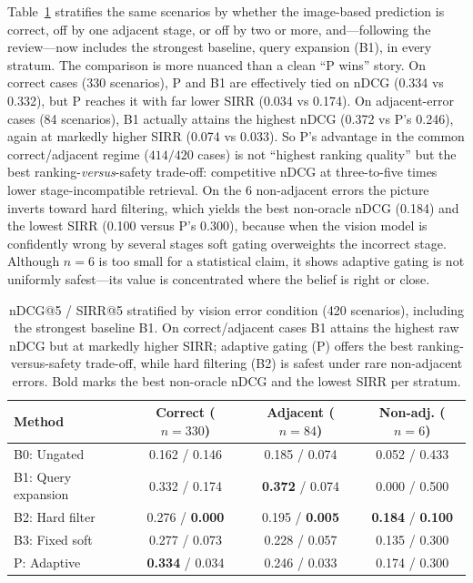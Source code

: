 \documentclass{llncs}
\begin{document}
Table~\ref{tab:strat} stratifies the same scenarios by whether the image-based prediction is correct, off by one adjacent stage, or off by two or more, and---following the review---now includes the strongest baseline, query expansion (B1), in every stratum. The comparison is more nuanced than a clean ``P wins'' story. On correct cases (330 scenarios), P and B1 are effectively tied on nDCG (0.334 vs 0.332), but P reaches it with far lower SIRR (0.034 vs 0.174). On adjacent-error cases (84 scenarios), B1 actually attains the highest nDCG (0.372 vs P's 0.246), again at markedly higher SIRR (0.074 vs 0.033). So P's advantage in the common correct/adjacent regime ($414/420$ cases) is not ``highest ranking quality'' but the best ranking-\emph{versus}-safety trade-off: competitive nDCG at three-to-five times lower stage-incompatible retrieval. On the 6 non-adjacent errors the picture inverts toward hard filtering, which yields the best non-oracle nDCG (0.184) and the lowest SIRR (0.100 versus P's 0.300), because when the vision model is confidently wrong by several stages soft gating overweights the incorrect stage. Although $n=6$ is too small for a statistical claim, it shows adaptive gating is not uniformly safest---its value is concentrated where the belief is right or close.

\begin{table}[t]
\centering
\caption{nDCG@5 / SIRR@5 stratified by vision error condition (420 scenarios), including the strongest baseline B1. On correct/adjacent cases B1 attains the highest raw nDCG but at markedly higher SIRR; adaptive gating (P) offers the best ranking-versus-safety trade-off, while hard filtering (B2) is safest under rare non-adjacent errors. Bold marks the best non-oracle nDCG and the lowest SIRR per stratum.}
\label{tab:strat}
\small
\begin{tabular}{lccc}
\toprule
\textbf{Method} & \textbf{Correct ($n{=}330$)} & \textbf{Adjacent ($n{=}84$)} & \textbf{Non-adj. ($n{=}6$)} \\
\midrule
B0: Ungated & 0.162 / 0.146 & 0.185 / 0.074 & 0.052 / 0.433 \\
B1: Query expansion & 0.332 / 0.174 & \textbf{0.372} / 0.074 & 0.000 / 0.500 \\
B2: Hard filter & 0.276 / \textbf{0.000} & 0.195 / \textbf{0.005} & \textbf{0.184} / \textbf{0.100} \\
B3: Fixed soft & 0.277 / 0.073 & 0.228 / 0.057 & 0.135 / 0.300 \\
P: Adaptive & \textbf{0.334} / 0.034 & 0.246 / 0.033 & 0.174 / 0.300 \\
\bottomrule
\end{tabular}
\end{table}
\end{document}

